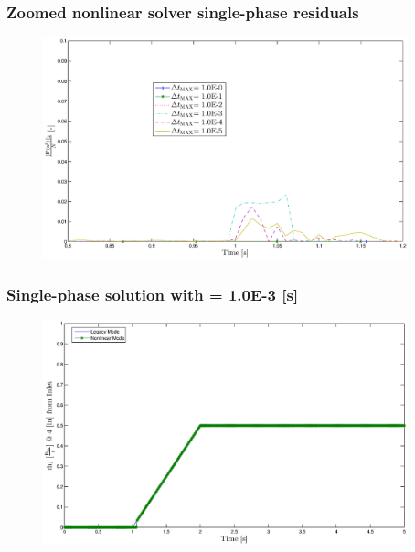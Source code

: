 \documentclass[compress,xcolor=table]{beamer}
\begin{document}
\begin{frame}
\frametitle{Zoomed nonlinear solver single-phase residuals}

\begin{figure}[h!t]
\centering
\includegraphics[width=0.94\textwidth]{images/nl_res_single_zoom.eps}
\end{figure}

\end{frame}
\begin{frame}
\frametitle{Single-phase solution with \dtmax{} = 1.0E-3 {[s]}}

\begin{figure}[h!t]
\centering
\includegraphics[width=0.94\textwidth]{images/single_1em3.eps}
\end{figure}

\end{frame}
\end{document}
